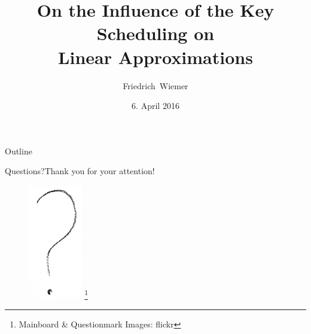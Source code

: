 \documentclass[12pt,mathserif,professionalfont]{beamer}
\title[On the Influence of the Key Scheduling on Linear Approximations]{On the Influence of the Key Scheduling on\\Linear Approximations}
\subtitle{}
\author[Friedrich~Wiemer]{Friedrich~Wiemer}
\institute{%
	CITS Oberseminar
}
\date{6. April 2016}
\newcommand{\blfootnote}[1]{%
	\begingroup
	\renewcommand\thefootnote{}\footnote{#1}%
	\addtocounter{footnote}{-1}%
	\endgroup
}
\begin{document}
\begin{frame}
	\titlepage{}
\end{frame}

\begin{frame}{Outline}
	\tableofcontents
\end{frame}







\begin{frame}{Questions?}{Thank you for your attention!}
	\begin{figure}[!htb]
		\includegraphics[height=50mm]{data/flickr/questionmark.png}\blfootnote{\scriptsize Mainboard \& Questionmark Images: flickr}
	\end{figure}
\end{frame}

\end{document}
